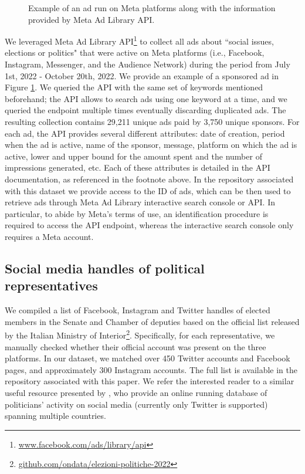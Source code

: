 \documentclass[sigconf,screen]{acmart}
\begin{document}
\begin{figure}[!t]
\begin{minipage}{0.48\linewidth}
    \end{minipage}
    \caption{Example of an ad run on Meta platforms along with the information provided by Meta Ad Library API.}
    \label{fig:ad-meta}
\end{figure}




We leveraged Meta Ad Library API\footnote{\url{www.facebook.com/ads/library/api}} to collect all ads about ``social issues, elections or politics" that were active on Meta platforms (i.e., Facebook, Instagram, Messenger, and the Audience Network) during the period from July 1st, 2022 - October 20th, 2022. We provide an example of a sponsored ad in Figure \ref{fig:ad-meta}. We queried the API with the same set of keywords mentioned beforehand; the API allows to search ads using one keyword at a time, and we queried the endpoint multiple times eventually discarding duplicated ads. The resulting collection contains 29,211 unique ads paid by 3,750 unique sponsors. For each ad, the API provides several different attributes: date of creation, period when the ad is active, name of the sponsor, message, platform on which the ad is active, lower and upper bound for the amount spent and the number of impressions generated, etc. Each of  these attributes is detailed in the API documentation, as referenced in the footnote above. In the repository associated with this dataset we provide access to the ID of ads, which can be then used to retrieve ads through Meta Ad Library interactive search console or API. In particular, to abide by Meta's terms of use, an identification procedure is required to access the API endpoint, whereas the interactive search console only requires a Meta account.

\subsection{Social media handles of political representatives}
We compiled a list of Facebook, Instagram and Twitter handles of elected members in the Senate and Chamber of deputies based on the official list released by the Italian Ministry of Interior\footnote{ \url{github.com/ondata/elezioni-politiche-2022}}. Specifically, for each representative, we manually checked whether their official account was present on the three platforms. 
In our dataset, we matched over 450 Twitter accounts and Facebook pages, and approximately 300 Instagram accounts.  The full list is available in the repository associated with this paper. We refer the interested reader to a similar useful resource presented by \cite{haman2021politicians}, who provide an online running database of politicians' activity on social media (currently only Twitter is supported) spanning multiple countries.
\end{document}
